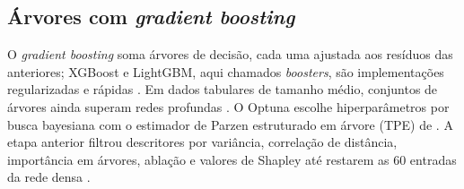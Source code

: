 \subsection{Árvores com \texorpdfstring{\textit{gradient boosting}}{gradient boosting}}
\label{sec:rev_arvores}

O \textit{gradient boosting} soma árvores de decisão, cada uma ajustada aos resíduos das anteriores; XGBoost e LightGBM, aqui chamados \textit{boosters}, são implementações regularizadas e rápidas \cite{chen2016xgboost, ke2017lightgbm}. Em dados tabulares de tamanho médio, conjuntos de árvores ainda superam redes profundas \cite{grinsztajn2022why}. O Optuna \cite{akiba2019optuna} escolhe hiperparâmetros por busca bayesiana com o estimador de Parzen estruturado em árvore (TPE) de . A etapa anterior filtrou descritores por variância, correlação de distância, importância em árvores, ablação e valores de Shapley até restarem as \num{60} entradas da rede densa \cite{vicentin2024study}.
